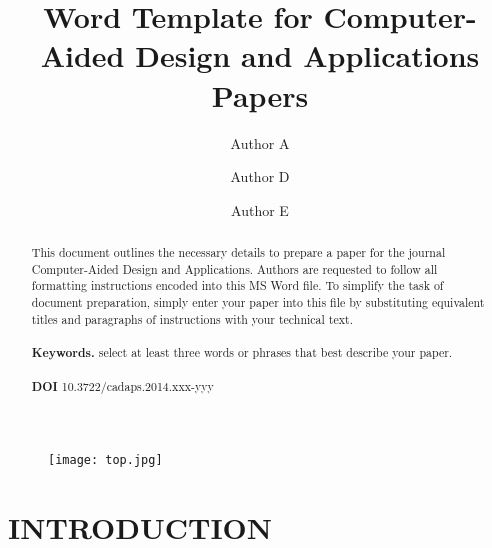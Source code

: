 \documentclass[9pt,a4paper]{article}
\begin{document}
\begin{figure}
  \centering
  \texttt{[image: top.jpg]}\\
\end{figure}
\title{\fontsize{12}{14.4}\textbf{Word Template for Computer-Aided Design and Applications Papers}} %
\author[1]{\fontsize{9}{10.8}Author A}
\author[2]{\fontsize{9}{10.8}Author D}
\author[2]{\fontsize{9}{10.8}Author E}
\date{}
\maketitle %
\thispagestyle{empty}



\begin{abstract}
    \noindent This document outlines the necessary details to prepare a paper for the journal Computer-Aided Design and Applications. Authors are requested to follow all formatting instructions encoded into this MS Word file. To simplify the task of document preparation, simply enter your paper into this file by substituting equivalent titles and paragraphs of instructions with your technical text.\\
\\
    \textbf{Keywords.} select at least three words or phrases that best describe your paper.\\
   \\
    \textbf{DOI} 10.3722/cadaps.2014.xxx-yyy\\
\end{abstract}



\section{INTRODUCTION}
\end{document}
